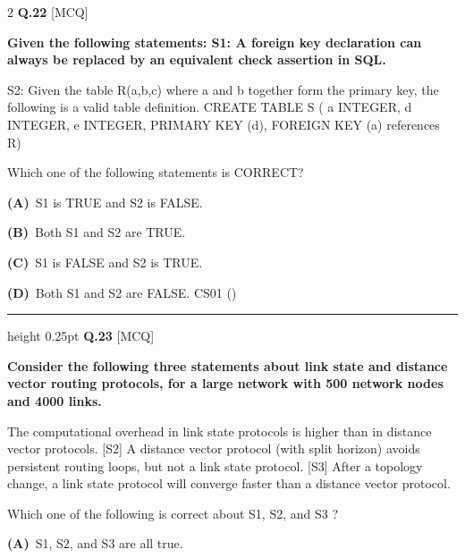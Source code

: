 \documentclass[a4paper,10pt,twoside]{article}
\begin{document}
\begin{multicols}{2}
\noindent\textbf{Q.22} \hfill {\footnotesize\textsf{[MCQ]}}
\par\vspace{2pt}
{\bfseries Given the following statements:
S1: A foreign key declaration can always be replaced by an equivalent check
assertion in SQL.
\par\smallskip
S2: Given the table R(a,b,c) where a and b together form the primary key,
the following is a valid table definition.
CREATE TABLE S (
a INTEGER,
d INTEGER,
e INTEGER,
PRIMARY KEY (d),
FOREIGN KEY (a) references R)
\par\smallskip
Which one of the following statements is CORRECT? \par}
\par\vspace{2pt}\noindent
\textbf{(A)}~S1 is TRUE and S2 is FALSE.\par\vspace{2pt}\noindent
\textbf{(B)}~Both S1 and S2 are TRUE.\par\vspace{2pt}\noindent
\textbf{(C)}~S1 is FALSE and S2 is TRUE.\par\vspace{2pt}\noindent
\textbf{(D)}~Both S1 and S2 are FALSE. \newline CS01 ()
\par\vspace{6pt}\hrule height 0.25pt\vspace{6pt}
\noindent\textbf{Q.23} \hfill {\footnotesize\textsf{[MCQ]}}
\par\vspace{2pt}
{\bfseries Consider the following three statements about link state and distance vector routing protocols, for a
large network with 500 network nodes and 4000 links.
\par\smallskip
[S1] The computational overhead in link state protocols is higher than in distance vector protocols.
[S2] A distance vector protocol (with split horizon) avoids persistent routing loops, but not a link
state protocol.
[S3] After a topology change, a link state protocol will converge faster than a distance vector
protocol.
\par\smallskip
Which one of the following is correct about S1, S2, and S3 ? \par}
\par\vspace{2pt}\noindent
\textbf{(A)}~S1, S2, and S3 are all true.\par\vspace{2pt}\noindent

\end{multicols}
\end{document}
